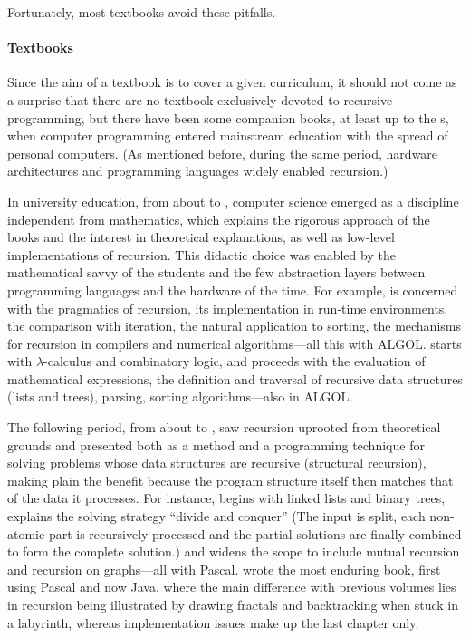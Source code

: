 \documentclass[11pt,a4paper]{article}
\newcommand\plang[1]{\textsf{#1}\xspace}
\begin{document}
Fortunately, most textbooks avoid these pitfalls.

\paragraph{Textbooks}
\label{textbooks}

Since the aim of a textbook is to cover a given curriculum, it should
not come as a surprise that there are no textbook exclusively devoted
to recursive programming, but there have been some companion books, at
least up to the s, when computer programming
entered mainstream education with the spread of personal
computers. (As mentioned before, during the same period, hardware
architectures and programming languages widely enabled recursion.)

In university education, from about  to
, computer science emerged as a discipline
independent from mathematics, which explains the rigorous approach of
the books and the interest in theoretical explanations, as well as
low\hyp{}level implementations of recursion. This didactic choice was
enabled by the mathematical savvy of the students and the few
abstraction layers between programming languages and the hardware of
the time. For example, \textcite{Barron:1968} is concerned with the
pragmatics of recursion, its implementation in run\hyp{}time
environments, the comparison with iteration, the natural application
to sorting, the mechanisms for recursion in compilers and numerical
algorithms---all this with \plang{ALGOL}. \textcite{Burge:1975} starts
with \(\lambda\)\hyp{}calculus and combinatory logic, and proceeds
with the evaluation of mathematical expressions, the definition and
traversal of recursive data structures (lists and trees), parsing,
sorting algorithms---also in \plang{ALGOL}.

The following period, from about  to
, saw recursion uprooted from theoretical grounds
and presented both as a method and a programming technique for solving
problems whose data structures are recursive (structural recursion),
making plain the benefit because the program structure itself then
matches that of the data it processes. For instance,
\textcite{Rohl:1984} begins with linked lists and binary trees,
explains the solving strategy ``divide and conquer'' (The input is
split, each non\hyp{}atomic part is recursively processed and the
partial solutions are finally combined to form the complete solution.)
and widens the scope to include mutual recursion
\citep{RubioUrquizaPareja:2008} and recursion on graphs---all with
\plang{Pascal}. \textcite{Roberts:1986} \citeyearpar{Roberts:2006}
wrote the most enduring book, first using \plang{Pascal} and now
\plang{Java}, where the main difference with previous volumes lies in
recursion being illustrated by drawing fractals and backtracking when
stuck in a labyrinth, whereas implementation issues make up the last
chapter only.
\end{document}

